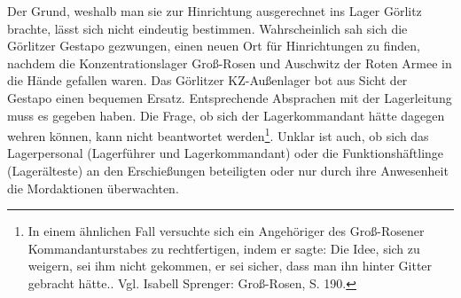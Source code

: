 Der Grund, weshalb man sie zur Hinrichtung ausgerechnet ins Lager Görlitz brachte, lässt sich nicht eindeutig bestimmen. Wahrscheinlich sah sich die Görlitzer Gestapo gezwungen, einen neuen Ort für Hinrichtungen zu finden, nachdem die Konzentrationslager Groß-Rosen und Auschwitz der Roten Armee in die Hände gefallen waren. Das Görlitzer KZ-Außenlager bot aus Sicht der Gestapo einen bequemen Ersatz. Entsprechende Absprachen mit der Lagerleitung muss es gegeben haben. Die Frage, ob sich der Lagerkommandant hätte dagegen wehren können, kann nicht beantwortet werden\footnote{In einem ähnlichen Fall versuchte sich ein Angehöriger des Groß-Rosener Kommandanturstabes zu rechtfertigen, indem er sagte: \glqq Die Idee, sich zu weigern, sei ihm nicht gekommen, er sei sicher, dass man ihn hinter Gitter gebracht hätte.\grqq. Vgl. Isabell Sprenger: Groß-Rosen, S. 190.}. Unklar ist auch, ob sich das Lagerpersonal (Lagerführer und Lagerkommandant) oder die Funktionshäftlinge (Lagerälteste) an den Erschießungen beteiligten oder nur durch ihre Anwesenheit die Mordaktionen überwachten.
\newline


